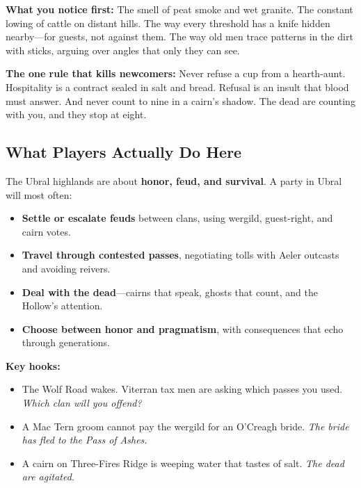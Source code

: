 \begin{tcolorbox}[colback=black!3,colframe=blue!60!black,title={Theme \& Atmosphere},breakable]
\vspace{2mm}
\textbf{What you notice first:} The smell of peat smoke and wet granite. The constant lowing of cattle on distant hills. The way every threshold has a knife hidden nearby---for guests, not against them. The way old men trace patterns in the dirt with sticks, arguing over angles that only they can see.

\textbf{The one rule that kills newcomers:} Never refuse a cup from a hearth-aunt. Hospitality is a contract sealed in salt and bread. Refusal is an insult that blood must answer. And never count to nine in a cairn's shadow. The dead are counting with you, and they stop at eight.
\end{tcolorbox}

\subsection*{What Players Actually Do Here}
\label{sec:ubral-player-hooks}

The Ubral highlands are about \textbf{honor, feud, and survival}. A party in Ubral will most often:

\begin{itemize}
  \item \textbf{Settle or escalate feuds} between clans, using wergild, guest-right, and cairn votes.
  \item \textbf{Travel through contested passes}, negotiating tolls with Aeler outcasts and avoiding reivers.
  \item \textbf{Deal with the dead}---cairns that speak, ghosts that count, and the Hollow's attention.
  \item \textbf{Choose between honor and pragmatism}, with consequences that echo through generations.
\end{itemize}

\textbf{Key hooks:}
\begin{itemize}
  \item The Wolf Road wakes. Viterran tax men are asking which passes you used. \textit{Which clan will you offend?}
  \item A Mac Tern groom cannot pay the wergild for an O'Creagh bride. \textit{The bride has fled to the Pass of Ashes.}
  \item A cairn on Three-Fires Ridge is weeping water that tastes of salt. \textit{The dead are agitated.}
\end{itemize}

